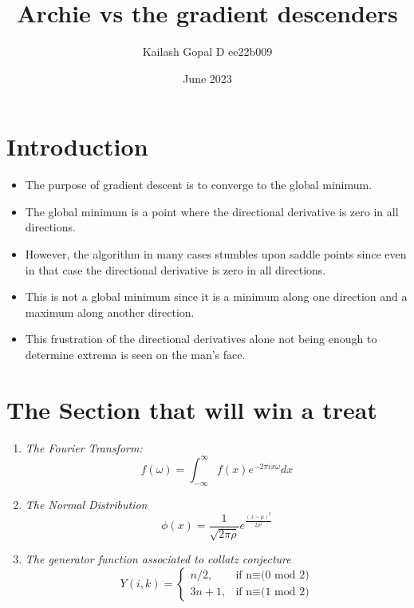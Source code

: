 \documentclass{article}
\title{Archie vs the gradient descenders}
\author{Kailash Gopal D ee22b009}
\date{June 2023}
\begin{document}
	
	\maketitle
	
	\section{Introduction}
	\begin{itemize}
		\item The purpose of gradient descent is to converge to the global minimum.
		\item The global minimum is a point where the directional derivative is zero in all directions. 
		\item However, the algorithm in many cases stumbles upon saddle points since even in that case the directional derivative is zero in all directions.
		\item This is not a global minimum since it is a minimum along one direction and a maximum along another direction.
		\item This frustration of the directional derivatives alone not being enough to determine extrema is seen on the man's face.
	\end{itemize}
	\section{The Section that will win a treat}
	\begin{enumerate}
		\item \textit{The Fourier Transform:}\begin{equation}
			f(\omega) = \int_{-\infty}^{\infty}f(x)e^{-2\pi ix\omega}dx
		\end{equation}
		\item \textit{The Normal Distribution}\begin{equation}
			\phi(x) = \frac{1}{\sqrt{2\pi\rho}}e^{\frac{(x-\mu)^2}{2\rho^2}}
		\end{equation}
		\item \textit{The generator function associated to collatz conjecture}
		\begin{equation}
			Y(i,k) = 
			\left\{
			\begin{array}{lr}
				n/2, & \text{if n} \equiv \text{(0 mod 2)} \\
				3n + 1, & \text{if n} \equiv \text{(1 mod 2)}
			\end{array}
			\right.
		\end{equation}
	\end{enumerate}
\end{document}
